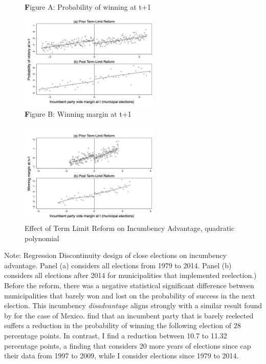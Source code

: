 \documentclass[12pt]{amsart}
\numberwithin{equation}{section}
\theoremstyle{definition}
\theoremstyle{definition}
\theoremstyle{definition}
\begin{document}
\begin{appendix}
\begin{figure}[H]
\centering
\caption{Effect of Term Limit Reform on Incumbency Advantage, quadratic polynomial}
  \label{fig:incumbency_advantage} 

	{\textbf Figure A: Probability of winning at t+1}
	 \includegraphics[width=0.6\textwidth]{Figures_incumbency/RDD_incumbency_pol2.png}
	 \\
	{\textbf Figure B: Winning margin at t+1}

 \includegraphics[width=0.6\textwidth]{Figures_incumbency/RDD_incumbency_margin_pol2.png}
     \captionsetup{justification=centering}  
       
\end{figure} 
       Note: Regression Discontinuity design of close elections on incumbency advantage. Panel (a) considers all elections from 1979 to 2014. Panel (b) considers all elections after 2014 for municipalities that implemented reelection.) 
\\
       
Before the reform, there was a negative statistical significant difference between municipalities that barely won and lost on the probability of success in the next election. This incumbency \emph{disadvantage} aligns strongly with a similar result found by \citet{klasnja_titiunik_2017} for the case of Mexico. \citet{klasnja_titiunik_2017} find that an incumbent party that is barely reelected suffers a reduction in the probability of winning the following election of 28 percentage points. In contrast, I find a reduction between 10.7 to 11.32 percentage points, a finding that considers 20 more years of elections since \citet{klasnja_titiunik_2017} cap their data from 1997 to 2009, while I consider elections since 1979 to 2014. 


\end{appendix}
\end{document}
